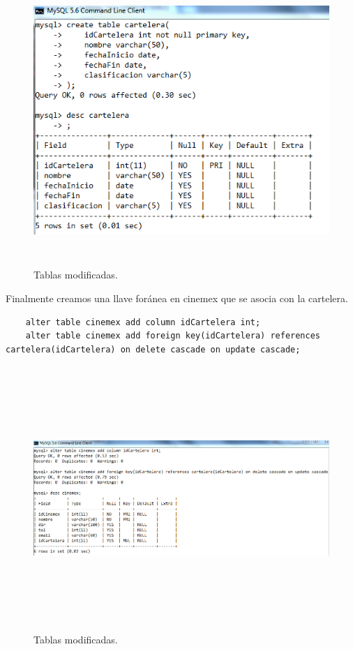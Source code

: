 \documentclass[12pt, titlepage]{article}
\begin{document}
    \begin{figure}[H]
        \begin{center}
            \includegraphics[width=16cm, height=11cm]{img/cartelera.png}
            \caption{Tablas modificadas.}
            \label{fig:foranea}
        \end{center}
    \end{figure}
    Finalmente creamos una llave foránea en cinemex que se asocia con la cartelera.
    \begin{lstlisting}
    alter table cinemex add column idCartelera int;
    alter table cinemex add foreign key(idCartelera) references cartelera(idCartelera) on delete cascade on update cascade;
    \end{lstlisting}
    \begin{figure}[H]
        \begin{center}
            \includegraphics[width=16cm, height=10cm]{img/foranea-cartelera.png}
            \caption{Tablas modificadas.}
            \label{fig:foranea-cartelera}
        \end{center}
    \end{figure}
\end{document}
